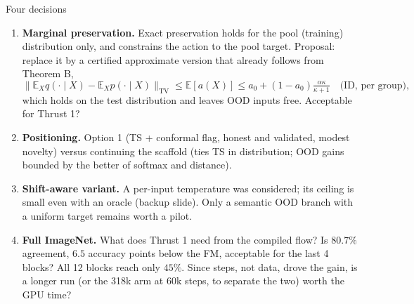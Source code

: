 \documentclass[aspectratio=169,11pt]{beamer}
\newcommand{\E}{\mathbb{E}}
\begin{document}
\begin{frame}{Four decisions}
  \small
  \begin{enumerate}
    \item \textbf{Marginal preservation.} Exact preservation holds for the pool (training) distribution only, and constrains the action to the pool target. Proposal: replace it by a certified approximate version that already follows from Theorem B,
      \[ \big\|\E_X q(\cdot\mid X)-\E_X p(\cdot\mid X)\big\|_{\mathrm{TV}}\le\E[a(X)]\le a_0+(1-a_0)\tfrac{\alpha\kappa}{\kappa+1}\quad\text{(ID, per group)}, \]
      which holds on the test distribution and leaves OOD inputs free. Acceptable for Thrust 1?
    \item \textbf{Positioning.} Option 1 (TS + conformal flag, honest and validated, modest novelty) versus continuing the scaffold (ties TS in distribution; OOD gains bounded by the better of softmax and distance).
    \item \textbf{Shift-aware variant.} A per-input temperature was considered; its ceiling is small even with an oracle (backup slide). Only a semantic OOD branch with a uniform target remains worth a pilot.
    \item \textbf{Full ImageNet.} What does Thrust 1 need from the compiled flow? Is $80.7\%$ agreement, $6.5$ accuracy points below the FM, acceptable for the last 4 blocks? All 12 blocks reach only $45\%$. Since steps, not data, drove the gain, is a longer run (or the 318k arm at 60k steps, to separate the two) worth the GPU time?
  \end{enumerate}
\end{frame}
\end{document}
